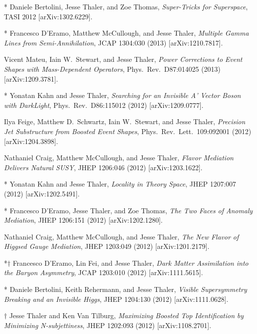 \begin{list}{[]\addtocounter{jessecount}{-1}}{\leftmargin=3em \itemsep=4pt}
\item
* Daniele Bertolini, Jesse Thaler, and Zoe Thomas,
\emph{Super-Tricks for Superspace},
TASI 2012
[arXiv:1302.6229].

\item
* Francesco D'Eramo, Matthew McCullough, and Jesse Thaler,
\emph{Multiple Gamma Lines from Semi-Annihilation},
JCAP 1304:030 (2013)
[arXiv:1210.7817].

\item
 Vicent Mateu, Iain W.\ Stewart, and Jesse Thaler,
\emph{Power Corrections to Event Shapes with Mass-Dependent Operators},
Phys.\ Rev.\ D87:014025 (2013)
[arXiv:1209.3781].

\item
* Yonatan Kahn and Jesse Thaler,
\emph{Searching for an Invisible A' Vector Boson with DarkLight},
Phys.\ Rev.\ D86:115012 (2012)
[arXiv:1209.0777].

\item
 Ilya Feige, Matthew D.\ Schwartz, Iain W.\ Stewart, and Jesse Thaler,
\emph{Precision Jet Substructure from Boosted Event Shapes},
Phys.\ Rev.\ Lett.\ 109:092001 (2012)
[arXiv:1204.3898].

\item
 Nathaniel Craig, Matthew McCullough, and Jesse Thaler,
\emph{Flavor Mediation Delivers Natural SUSY},
JHEP 1206:046 (2012)
[arXiv:1203.1622].

\item
* Yonatan Kahn and Jesse Thaler,
\emph{Locality in Theory Space},
JHEP 1207:007 (2012)
[arXiv:1202.5491].

\item
* Francesco D'Eramo, Jesse Thaler, and Zoe Thomas,
\emph{The Two Faces of Anomaly Mediation},
JHEP 1206:151 (2012)
[arXiv:1202.1280].

\item
 Nathaniel Craig, Matthew McCullough, and Jesse Thaler,
\emph{The New Flavor of Higgsed Gauge Mediation},
JHEP 1203:049 (2012)
[arXiv:1201.2179].

\item
*$\dagger$ Francesco D'Eramo, Lin Fei, and Jesse Thaler,
\emph{Dark Matter Assimilation into the Baryon Asymmetry},
JCAP 1203:010 (2012)
[arXiv:1111.5615].

\item
* Daniele Bertolini, Keith Rehermann, and Jesse Thaler,
\emph{Visible Supersymmetry Breaking and an Invisible Higgs},
JHEP 1204:130 (2012)
[arXiv:1111.0628].

\item
$\dagger$ Jesse Thaler and Ken Van Tilburg,
\emph{Maximizing Boosted Top Identification by Minimizing N-subjettiness},
JHEP 1202:093 (2012)
[arXiv:1108.2701].


\end{list}
